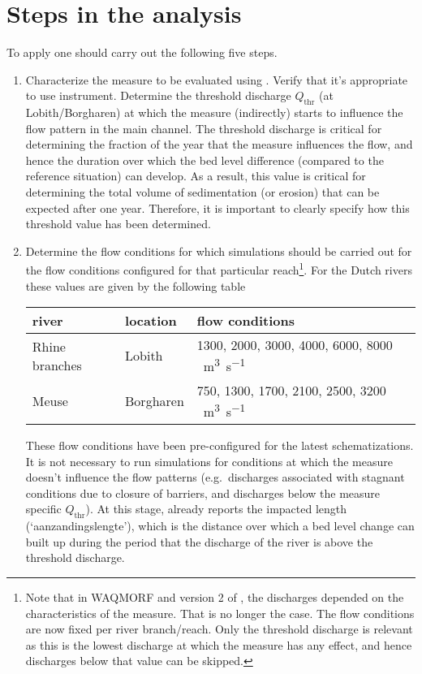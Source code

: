 \chapter{Steps in the analysis}\label{Chp:steps}

To apply \dfastmi one should carry out the following five steps.

\begin{enumerate}
\item Characterize the measure to be evaluated using \dfastmi.
Verify that it's appropriate to use \dfastmi instrument.
Determine the threshold discharge $Q_\text{thr}$ (at Lobith/Borgharen) at which the measure (indirectly) starts to influence the flow pattern in the main channel.
The threshold discharge is critical for determining the fraction of the year that the measure influences the flow, and hence the duration over which the bed level difference (compared to the reference situation) can develop.
As a result, this value is critical for determining the total volume of sedimentation (or erosion) that can be expected after one year.
Therefore, it is important to clearly specify how this threshold value has been determined.

\item Determine the flow conditions for which \dflowfm simulations should be carried out for the flow conditions configured for that particular reach\footnote{Note that in WAQMORF and version 2 of \dfastmi, the discharges depended on the characteristics of the measure.
That is no longer the case.
The flow conditions are now fixed per river branch/reach.
Only the threshold discharge is relevant as this is the lowest discharge at which the measure has any effect, and hence discharges below that value can be skipped.}.
For the Dutch rivers these values are given by the following table
\newline
\newline
\begin{tabular}{l|l|l}
river & location & flow conditions \\ \hline
Rhine branches & Lobith & 1300, 2000, 3000, 4000, 6000, 8000 \SI{}{\metre\cubed\per\second}\\
Meuse & Borgharen & 750, 1300, 1700, 2100, 2500, 3200 \SI{}{\metre\cubed\per\second}
\end{tabular}
\newline
\newline
These flow conditions have been pre-configured for the latest \dflowfm schematizations.
It is not necessary to run simulations for conditions at which the measure doesn't influence the flow patterns (e.g.~discharges associated with stagnant conditions due to closure of barriers, and discharges below the measure specific $Q_\text{thr}$).
At this stage, \dfmi already reports the impacted length (`aanzandingslengte'), which is the distance over which a bed level change can built up during the period that the discharge of the river is above the threshold discharge.


\end{enumerate}
